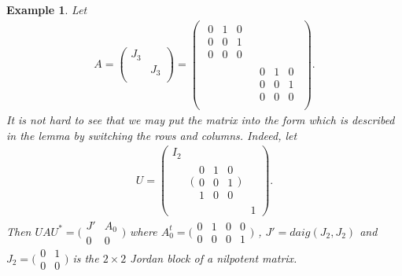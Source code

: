 \documentclass[a4paper,10pt]{amsart}
\newtheorem{example}{Example}[section]
\theoremstyle{refs}
\begin{document}
\begin{example} Let
    \begin{align*}
        A =  \left (
        \begin{smallmatrix}
          J_{3} &  \\
          & J_{3}  \\
        \end{smallmatrix}
        \right )
    =
       \left ( \begin{smallmatrix}
               \begin{smallmatrix}
               0 & 1 & 0\\
               0 & 0 & 1\\
               0 & 0 & 0
              \end{smallmatrix}  &  \\
                &  \begin{smallmatrix}
               0 & 1 & 0\\
               0 & 0 & 1\\
               0 & 0 & 0
              \end{smallmatrix} \\
              \end{smallmatrix} \right ).
    \end{align*}
It is not hard to see  that we may put the matrix into the
form which is described in the lemma by switching the rows and columns.
Indeed, let
\begin{align*}
U =  \left (\begin{smallmatrix}
        I_2 &  & \\
         & \bigl(\begin{smallmatrix}
              0 & 1 & 0\\
              0 & 0 & 1\\
              1 & 0 & 0
              \end{smallmatrix}\bigr) & \\
         &  & 1
       \end{smallmatrix}\right).
\end{align*}
Then
$UAU^{*}= \bigl(\begin{smallmatrix}
                  J' & A_{0}\\
                  0 & 0
                  \end{smallmatrix}\bigr)$
where
$A_0^{t}= \bigl(\begin{smallmatrix}
                 0 & 1 & 0 & 0\\
                 0 & 0 & 0 & 1
                \end{smallmatrix}\bigr)$
, $J'=daig(J_{2},J_{2})$ and
$J_{2} =
\bigl(\begin{smallmatrix}
       0 & 1\\
       0 & 0
      \end{smallmatrix}\bigr)$ is
the $2\times2 $ Jordan block of a nilpotent matrix.
\end{example}
\end{document}
